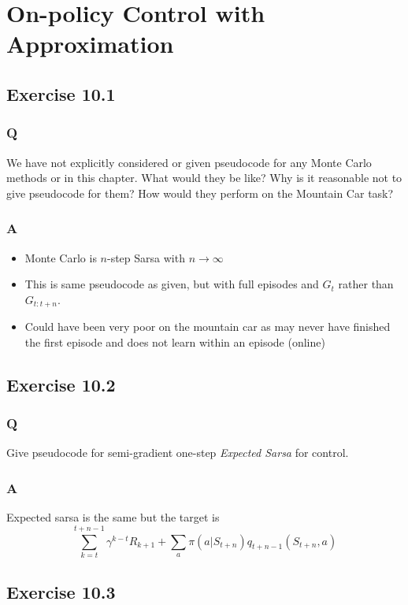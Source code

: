 \section{On-policy Control with Approximation}

\subsection{Exercise 10.1}
\subsubsection*{Q}
We have not explicitly considered or given pseudocode for any Monte Carlo methods or in this chapter. What would they be like? Why is it reasonable not to give pseudocode for them? How would they perform on the Mountain Car task?

\subsubsection*{A}
\begin{itemize}
    \item Monte Carlo is $n$-step Sarsa with $n \to \infty$
    \item This is same pseudocode as given, but with full episodes and $G_t$ rather than $G_{t:t+n}$.
    \item Could have been very poor on the mountain car as may never have finished the first episode and does not learn within an episode (online)
\end{itemize}

\subsection{Exercise 10.2}
\subsubsection*{Q}
Give pseudocode for semi-gradient one-step \emph{Expected Sarsa} for control.

\subsubsection*{A}
Expected sarsa is the same but the target is 
\[
    \sum_{k=t}^{t +n -1} \gamma^{k-t} R_{k + 1} + \sum_a \pi(a \vert{} S_{t+n}) q_{t + n -1}(S_{t+n}, a)
\]

\subsection{Exercise 10.3}
